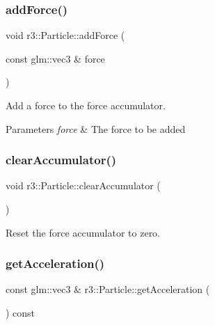 \subsubsection{\texorpdfstring{add\+Force()}{addForce()}}
{\footnotesize\ttfamily void r3\+::\+Particle\+::add\+Force (\begin{DoxyParamCaption}\item[{const glm\+::vec3 \&}]{force }\end{DoxyParamCaption})}



Add a force to the force accumulator. 


\begin{DoxyParams}{Parameters}
{\em force} & The force to be added \\
\hline
\end{DoxyParams}
\mbox{\label{classr3_1_1_particle_a1ba9a33fb4513cf79eb8bf4954ec6b97}} 
\subsubsection{\texorpdfstring{clear\+Accumulator()}{clearAccumulator()}}
{\footnotesize\ttfamily void r3\+::\+Particle\+::clear\+Accumulator (\begin{DoxyParamCaption}{ }\end{DoxyParamCaption})}



Reset the force accumulator to zero. 

\mbox{\label{classr3_1_1_particle_ab97ffa1b19d4fda5ea49b67531d0300d}} 
\subsubsection{\texorpdfstring{get\+Acceleration()}{getAcceleration()}}
{\footnotesize\ttfamily const glm\+::vec3 \& r3\+::\+Particle\+::get\+Acceleration (\begin{DoxyParamCaption}{ }\end{DoxyParamCaption}) const}



